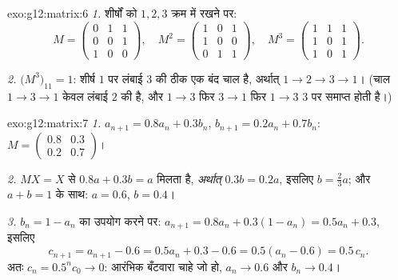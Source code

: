 \begin{solution}{exo:g12:matrix:6}
\emph{1.} शीर्षों को $1, 2, 3$ क्रम में रखने पर:
\[
M = \begin{pmatrix} 0&1&1\\ 0&0&1\\ 1&0&0\end{pmatrix}, \quad
M^2 = \begin{pmatrix} 1&0&1\\ 1&0&0\\ 0&1&1\end{pmatrix}, \quad
M^3 = \begin{pmatrix} 1&1&1\\ 1&0&1\\ 1&0&1 \end{pmatrix}.
\]

\emph{2.} $\bigl(M^3\bigr)_{11} = 1$: शीर्ष $1$ पर लंबाई $3$ की ठीक एक बंद चाल है, अर्थात् $1 \to 2 \to 3 \to 1$।
(चाल $1 \to 3 \to 1$ केवल लंबाई $2$ की है, और $1 \to 3$ फिर $3\to1$ फिर $1\to3$ $3$ पर समाप्त
होती है।)
\end{solution}

\begin{solution}{exo:g12:matrix:7}
\emph{1.} $a_{n+1} = 0.8a_n + 0.3b_n$, $b_{n+1} = 0.2a_n + 0.7b_n$: $M = \begin{pmatrix} 0.8 & 0.3\\ 0.2 & 0.7\end{pmatrix}$।

\emph{2.} $MX = X$ से $0.8a + 0.3b = a$ मिलता है, \emph{अर्थात्} $0.3b = 0.2a$, इसलिए $b = \frac23 a$; और $a + b = 1$ के
साथ: $a = 0.6$, $b = 0.4$।

\emph{3.} $b_n = 1 - a_n$ का उपयोग करने पर: $a_{n+1} = 0.8a_n + 0.3(1 - a_n) = 0.5a_n + 0.3$, इसलिए
\[
c_{n+1} = a_{n+1} - 0.6 = 0.5a_n + 0.3 - 0.6 = 0.5(a_n - 0.6) = 0.5\,c_n .
\]
अतः $c_n = 0.5^n c_0 \to 0$: आरंभिक बँटवारा चाहे जो हो, $a_n \to 0.6$ और $b_n \to 0.4$।
\end{solution}

